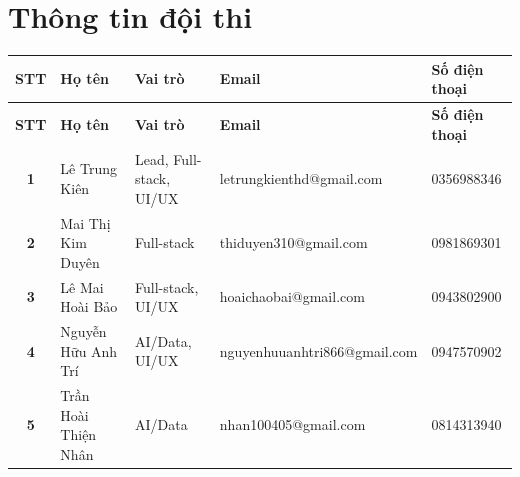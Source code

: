 \section{Thông tin đội thi}

\begingroup
\small
\begin{longtable}{|c|p{}|p{}|p{}|p{}|}
\hline
\textbf{STT} &
\centering\arraybackslash\textbf{Họ tên} &
\centering\arraybackslash\textbf{Vai trò} &
\centering\arraybackslash\textbf{Email} &
\centering\arraybackslash\textbf{Số điện thoại} \\ \hline
\endfirsthead

\hline
\textbf{STT} &
\centering\arraybackslash\textbf{Họ tên} &
\centering\arraybackslash\textbf{Vai trò} &
\centering\arraybackslash\textbf{Email} &
\centering\arraybackslash\textbf{Số điện thoại} \\ \hline
\endhead

\textbf{1} &
Lê Trung Kiên &
Lead, Full-stack, UI/UX &
 letrungkienthd@gmail.com &
0356988346 \\ \hline

\textbf{2} &
Mai Thị Kim Duyên &
Full-stack &
thiduyen310@gmail.com &
0981869301 \\ \hline

\textbf{3} &
Lê Mai Hoài Bảo &
Full-stack, UI/UX &
hoaichaobai@gmail.com &
0943802900 \\ \hline

\textbf{4} &
Nguyễn Hữu Anh Trí &
AI/Data, UI/UX &
nguyenhuuanhtri866@gmail.com &
0947570902 \\ \hline

\textbf{5} &
Trần Hoài Thiện Nhân &
AI/Data &
nhan100405@gmail.com &
0814313940 \\ \hline

\end{longtable}
\endgroup